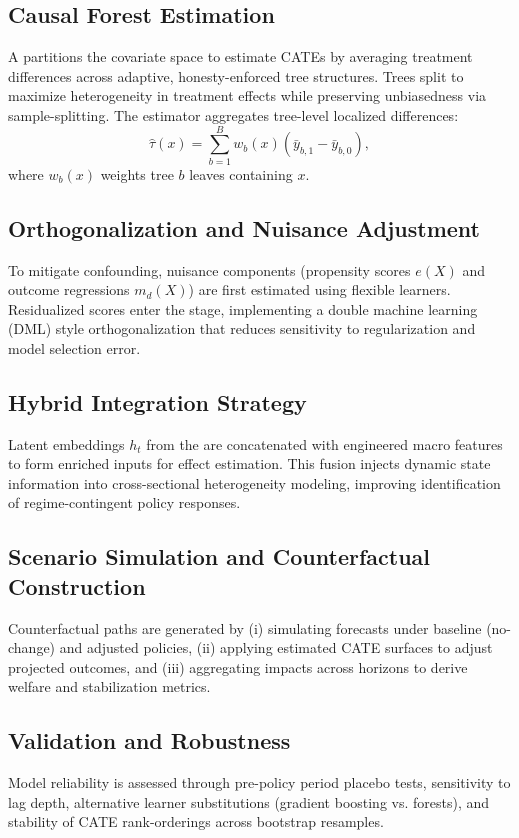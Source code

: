 \subsection{Causal Forest Estimation}
A \CF{} partitions the covariate space to estimate CATEs by averaging treatment differences across adaptive, honesty-enforced tree structures. Trees split to maximize heterogeneity in treatment effects while preserving unbiasedness via sample-splitting. The estimator aggregates tree-level localized differences:
\begin{equation}
  \hat{\tau}(x) = \sum_{b=1}^B w_b(x) \left( \bar{y}_{b,1} - \bar{y}_{b,0} \right),
\end{equation}
where $w_b(x)$ weights tree $b$ leaves containing $x$.

\subsection{Orthogonalization and Nuisance Adjustment}
To mitigate confounding, nuisance components (propensity scores $e(X)$ and outcome regressions $m_d(X)$) are first estimated using flexible learners. Residualized scores enter the \CF{} stage, implementing a double machine learning (DML) style orthogonalization that reduces sensitivity to regularization and model selection error.

\subsection{Hybrid Integration Strategy}
Latent embeddings $h_t$ from the \LSTM{} are concatenated with engineered macro features to form enriched inputs for effect estimation. This fusion injects dynamic state information into cross-sectional heterogeneity modeling, improving identification of regime-contingent policy responses.

\subsection{Scenario Simulation and Counterfactual Construction}
Counterfactual paths are generated by (i) simulating forecasts under baseline (no-change) and adjusted \VAT{} policies, (ii) applying estimated CATE surfaces to adjust projected outcomes, and (iii) aggregating impacts across horizons to derive welfare and stabilization metrics.

\subsection{Validation and Robustness}
Model reliability is assessed through pre-policy period placebo tests, sensitivity to lag depth, alternative learner substitutions (gradient boosting vs. forests), and stability of CATE rank-orderings across bootstrap resamples.

